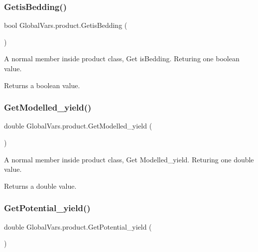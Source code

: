 \subsubsection{\texorpdfstring{GetisBedding()}{GetisBedding()}}
{\footnotesize\ttfamily bool Global\+Vars.\+product.\+Getis\+Bedding (\begin{DoxyParamCaption}{ }\end{DoxyParamCaption})\hspace{0.3cm}{\ttfamily [inline]}}



A normal member inside product class, Get is\+Bedding. Returing one boolean value. 

\begin{DoxyReturn}{Returns}
a boolean value. 
\end{DoxyReturn}
\mbox{\label{class_global_vars_1_1product_a03a183a7d8aaf4c69ebb1da4b6519ce2}} 
\subsubsection{\texorpdfstring{GetModelled\_yield()}{GetModelled\_yield()}}
{\footnotesize\ttfamily double Global\+Vars.\+product.\+Get\+Modelled\+\_\+yield (\begin{DoxyParamCaption}{ }\end{DoxyParamCaption})\hspace{0.3cm}{\ttfamily [inline]}}



A normal member inside product class, Get Modelled\+\_\+yield. Returing one double value. 

\begin{DoxyReturn}{Returns}
a double value. 
\end{DoxyReturn}
\mbox{\label{class_global_vars_1_1product_af36d802050e8d54552fe27e50c23fdf2}} 
\subsubsection{\texorpdfstring{GetPotential\_yield()}{GetPotential\_yield()}}
{\footnotesize\ttfamily double Global\+Vars.\+product.\+Get\+Potential\+\_\+yield (\begin{DoxyParamCaption}{ }\end{DoxyParamCaption})\hspace{0.3cm}{\ttfamily [inline]}}



